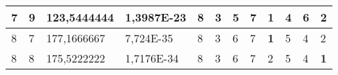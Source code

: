 \documentclass[conference]{IEEEtran}
\begin{document}
\begin{table*}[]
\begin{tabular}{|llll|llllllll|}
\multicolumn{1}{|l|}{7}                                                              & \multicolumn{1}{l|}{9}                                                                 & \multicolumn{1}{l|}{123,5444444}                                                           & 1,3987E-23                              & \multicolumn{1}{l|}{8}                                                           & \multicolumn{1}{l|}{3}                                                           & \multicolumn{1}{l|}{5}                                                           & \multicolumn{1}{l|}{7}                                                           & \multicolumn{1}{l|}{\textbf{1}}                                                  & \multicolumn{1}{l|}{4}                                                           & \multicolumn{1}{l|}{6}                                                           & 2                                   \\ \hline
\multicolumn{1}{|l|}{8}                                                              & \multicolumn{1}{l|}{7}                                                                 & \multicolumn{1}{l|}{177,1666667}                                                           & 7,724E-35                               & \multicolumn{1}{l|}{8}                                                           & \multicolumn{1}{l|}{3}                                                           & \multicolumn{1}{l|}{6}                                                           & \multicolumn{1}{l|}{7}                                                           & \multicolumn{1}{l|}{\textbf{1}}                                                  & \multicolumn{1}{l|}{5}                                                           & \multicolumn{1}{l|}{4}                                                           & 2                                   \\ \hline
\multicolumn{1}{|l|}{8}                                                              & \multicolumn{1}{l|}{8}                                                                 & \multicolumn{1}{l|}{175,5222222}                                                           & 1,7176E-34                              & \multicolumn{1}{l|}{8}                                                           & \multicolumn{1}{l|}{3}                                                           & \multicolumn{1}{l|}{6}                                                           & \multicolumn{1}{l|}{7}                                                           & \multicolumn{1}{l|}{2}                                                           & \multicolumn{1}{l|}{5}                                                           & \multicolumn{1}{l|}{4}                                                           & \textbf{1}                          \\ \hline

\end{tabular}
\end{table*}
\end{document}

